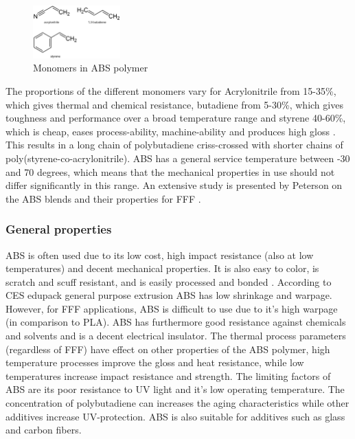 \begin{figure}[H]
    \centering
    \includegraphics[width=0.3\textwidth]{chapter_2/figures/ABSformula.PNG}
    \caption{Monomers in ABS polymer}
    \label{fig:ABSforumla}
\end{figure}
The proportions of the different monomers vary for Acrylonitrile from 15-35\%, which gives thermal and chemical resistance,  butadiene from 5-30\%, which gives toughness and performance over a broad temperature range and styrene 40-60\%, which is cheap, eases process-ability, machine-ability and produces high gloss \cite{Limited.2018CESEdupack}. This results in a long chain of polybutadiene criss-crossed with shorter chains of poly(styrene-co-acrylonitrile). ABS has a general service temperature between -30 and 70 degrees, which means that the mechanical properties in use should not differ significantly in this range. An extensive study is presented by Peterson on the ABS blends and their properties for FFF \cite{Peterson2019ReviewPerspective}.

\subsubsection{General properties}
ABS is often used due to its low cost, high impact resistance (also at low temperatures) and decent mechanical properties. It is also easy to color, is scratch and scuff resistant, and is easily processed and bonded \cite{Limited.2018CESEdupack}. According to CES edupack \cite{Limited.2018CESEdupack} general purpose extrusion ABS has low shrinkage and warpage. However, for FFF applications, ABS is difficult to use due to it's high warpage (in comparison to PLA). ABS has furthermore good resistance against chemicals and  solvents and is a decent electrical insulator. The thermal process parameters (regardless of FFF) have  effect on other properties of the ABS polymer, high temperature processes improve the gloss and heat resistance, while low temperatures increase impact resistance and strength. 
The limiting factors of ABS are its poor resistance to UV light and it's low operating temperature. The concentration of polybutadiene can increases the aging characteristics while other additives increase UV-protection. ABS is also suitable for additives such as glass and carbon fibers. 

